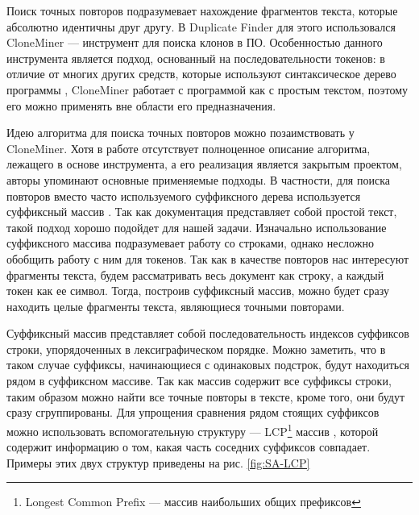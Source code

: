 \documentclass[14pt]{matmex-diploma-custom}
\begin{document}
Поиск точных повторов подразумевает нахождение фрагментов текста, которые абсолютно идентичны друг другу. В Duplicate Finder для этого использовался CloneMiner \cite{bib:tool:CloneMiner} --- инструмент для поиска клонов в ПО. Особенностью данного инструмента является подход, основанный на последовательности токенов: в отличие от многих других средств, которые используют синтаксическое дерево программы \cite{bib:tool:ASTSearch}, CloneMiner работает с программой как с простым текстом, поэтому его можно применять вне области его предназначения.

Идею алгоритма для поиска точных повторов можно позаимствовать у CloneMiner. Хотя в работе \cite{bib:tool:CloneMiner} отсутствует полноценное описание алгоритма, лежащего в основе инструмента, а его реализация является закрытым проектом, авторы упоминают основные применяемые подходы. В частности, для поиска повторов вместо часто используемого суффиксного дерева \cite{bib:art:SuffixTree} используется суффиксный массив \cite{bib:art:SuffixArray}. Так как документация представляет собой простой текст, такой подход хорошо подойдет для нашей задачи. Изначально использование суффиксного массива подразумевает работу со строками, однако несложно обобщить работу с ним для токенов. Так как в качестве повторов нас интересуют фрагменты текста, будем рассматривать весь документ как строку, а каждый токен как ее символ. Тогда, построив суффиксный массив, можно будет сразу находить целые фрагменты текста, являющиеся точными повторами.

Суффиксный массив представляет собой последовательность индексов суффиксов строки, упорядоченных в лексиграфическом порядке. Можно заметить, что в таком случае суффиксы, начинающиеся с одинаковых подстрок, будут находиться рядом в суффиксном массиве. Так как массив содержит все суффиксы строки, таким образом можно найти все точные повторы в тексте, кроме того, они будут сразу сгруппированы. Для упрощения сравнения рядом стоящих суффиксов можно использовать вспомогательную структуру --- LCP\footnote{Longest Common Prefix --- массив наибольших общих префиксов} массив \cite{bib:art:LCPArray}, которой содержит информацию о том, какая часть соседних суффиксов совпадает. Примеры этих двух структур приведены на рис. \ref{fig:SA-LCP}
\end{document}
